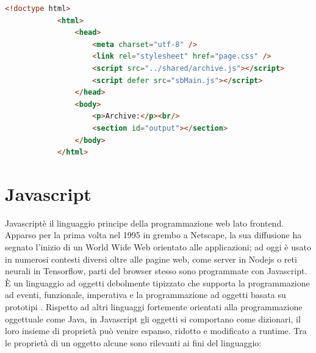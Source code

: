 \documentclass{sapthesis}
\newcommand{\www}{World Wide Web }
\newcommand{\JS}{Javascript}
\begin{document}
        \begin{lstlisting}[label={code:esempio-html},caption={Un semplice documento html},captionpos=b,language=HTML]
            <!doctype html>
            <html>
                <head>
                    <meta charset="utf-8" />
                    <link rel="stylesheet" href="page.css" />
                    <script src="../shared/archive.js"></script>
                    <script defer src="sbMain.js"></script>
                </head>
                <body>
                    <p>Archive:</p><br/>
                    <section id="output"></section>
                </body>
            </html>
        \end{lstlisting}

    
    \section{Javascript}
    \label{javascript}
        \JS è il linguaggio principe della programmazione web lato frontend. Apparso per la
        prima volta nel 1995 in grembo a Netscape, la sua diffusione ha segnato l'inizio di un \www
        orientato alle applicazioni; ad oggi è usato in numerosi contesti diversi oltre alle pagine web,
        come server in Nodejs o reti neurali in Tensorflow, parti del browser stesso sono programmate
        con \JS. 
        È un linguaggio ad oggetti debolmente tipizzato che supporta la programmazione ad eventi, 
        funzionale, imperativa e la programmazione ad oggetti basata su prototipi \cite{javascript-introduction}.
        Rispetto ad altri linguaggi fortemente orientati alla programmazione oggettuale come Java, in \JS
        gli oggetti si comportano come dizionari, il loro insieme di proprietà può venire espanso, ridotto e 
        modificato a runtime. Tra le proprietà di un oggetto alcune sono rilevanti ai fini del linguaggio:
\end{document}

